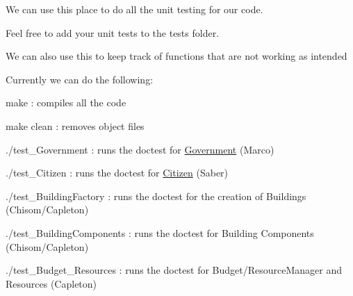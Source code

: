 We can use this place to do all the unit testing for our code.

Feel free to add your unit tests to the tests folder.

We can also use this to keep track of functions that are not working as intended

Currently we can do the following\+:

\textquotesingle{}make\textquotesingle{} \+: compiles all the code

\textquotesingle{}make clean\textquotesingle{} \+: removes object files

./test\+\_\+\+Government \+: runs the doctest for \mbox{\hyperlink{classGovernment}{Government}} (Marco)

./test\+\_\+\+Citizen \+: runs the doctest for \mbox{\hyperlink{classCitizen}{Citizen}} (Saber)

./test\+\_\+\+Building\+Factory \+: runs the doctest for the creation of Buildings (Chisom/\+Capleton)

./test\+\_\+\+Building\+Components \+: runs the doctest for Building Components (Chisom/\+Capleton)

./test\+\_\+\+Budget\+\_\+\+Resources \+: runs the doctest for Budget/\+Resource\+Manager and Resources (Capleton) 